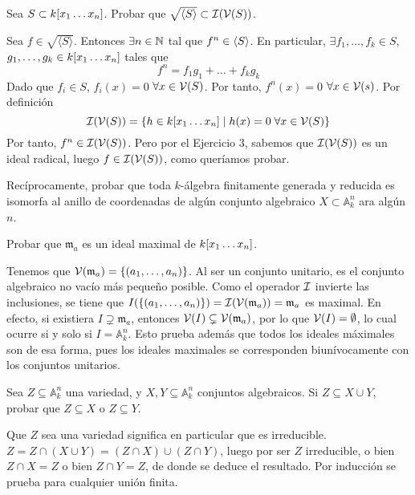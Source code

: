 \documentclass[twoside]{article}
\begin{document}
\newpage 
\begin{ejercicio}{4}
Sea $S\subset k[x_1\dotsc x_{n}]$. Probar que $\sqrt{\langle{S}\rangle}\subset \mathcal{I}(\mathcal{V}(S))$.
\begin{solucion}
Sea $f\in \sqrt{\langle{S}\rangle}$. Entonces $\exists n \in \mathbb{N}$ tal que $f^n \in \langle{S}\rangle$. En particular, $\exists f_1,\dotsc,f_k\in S$, $g_1,\dotsc,g_k \in k[x_1\dotsc x_{n}]$ tales que
$$
f^n = f_1 g_1 + \dotsc + f_k g_k 
$$
Dado que $f_i\in S$, $f_i(x)=0$ $\forall x \in \mathcal{V}(S)$. Por tanto, $f^n(x) = 0$ $\forall x \in \mathcal{V}(s)$. Por definición
$$
\mathcal{I}(\mathcal{V}(S)) =  \{ h \in k[x_1\dotsc x_{n}] \mid h(x)=0 \; \forall x\in \mathcal{V}(S)\}
$$
Por tanto, $f^n \in \mathcal{I}(\mathcal{V}(S))$. Pero por el Ejercicio 3, sabemos que $\mathcal{I}(\mathcal{V}(S))$ es un ideal radical, luego $f\in \mathcal{I}(\mathcal{V}(S))$, como queríamos probar.
\end{solucion}
\end{ejercicio}

\newpage 
\begin{ejercicio}{5}
Recíprocamente, probar que toda $k$-álgebra finitamente generada
y reducida es isomorfa al anillo de coordenadas de algún conjunto algebraico $X \subset \mathbb{A}^n_k$ ara algún $n$.\begin{solucion}
\end{solucion}
\end{ejercicio}

\begin{ejercicio}{6}
Probar que $\mathfrak{m}_a$ es un ideal maximal de $k[x_1\dotsc x_{n}]$.
\end{ejercicio}
\begin{solucion}
Tenemos que $\mathcal{V}(\mathfrak{m}_a)=\{(a_1,\dots,a_n)\}$. Al ser un conjunto unitario, es el conjunto algebraico no vacío más pequeño posible. Como el operador $\mathcal{I}$ invierte las inclusiones, se tiene que $I(\{(a_1,\dots,a_n)\})=\mathcal{I}(\mathcal{V}(\mathfrak{m}_a))=\mathfrak{m}_a$ es maximal. En efecto, si existiera $I\supsetneq\mathfrak{m}_a$, entonces $\mathcal{V}(I)\subsetneq \mathcal{V}(\mathfrak{m}_a)$, por lo que $\mathcal{V}(I)=\emptyset$, lo cual ocurre si y solo si $I=\mathbb{A}^n_k$. Esto prueba además que todos los ideales máximales son de esa forma, pues los ideales maximales se corresponden biunívocamente con los conjuntos unitarios.
\end{solucion}

\begin{ejercicio}{7}
Sea $Z ⊆ \mathbb{A}^n_k$
 una variedad, y $X, Y ⊆ \mathbb{A}^n_k$ conjuntos algebraicos.
Si $Z ⊆ X ∪ Y$, probar que $Z ⊆ X$ o $Z ⊆ Y$.
\end{ejercicio}
\begin{solucion}
Que $Z$ sea una variedad significa en particular que es irreducible. $Z=Z\cap( X\cup Y)=(Z\cap X)\cup(Z\cap Y)$, luego por ser $Z$ irreducible, o bien $Z\cap X=Z$ o bien $Z\cap Y=Z$, de donde se deduce el resultado. Por inducción se prueba para cualquier unión finita.
\end{solucion}
\end{document}
